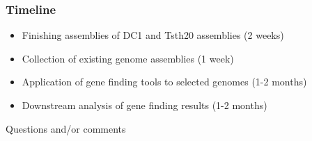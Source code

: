 \documentclass{beamer}
\begin{document}
\begin{frame}
  \frametitle{Timeline}
  \begin{itemize}
  \item Finishing assemblies of DC1 and Tsth20 assemblies (2 weeks)
  \item Collection of existing genome assemblies (1 week)
  \item Application of gene finding tools to selected genomes (1-2
    months)
  \item Downstream analysis of gene finding results (1-2 months)
  \end{itemize}
\end{frame}

\begin{frame}
  \begin{center}
    Questions and/or comments
  \end{center}
\end{frame}
\end{document}
